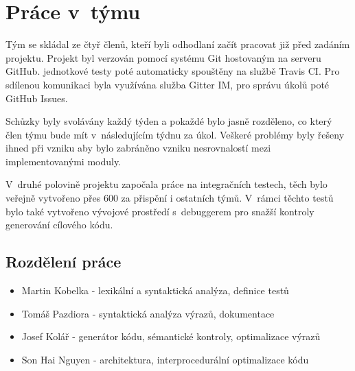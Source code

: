 \section{Práce v~týmu}
Tým se skládal ze čtyř členů, kteří byli odhodlaní začít
pracovat již před zadáním projektu. Projekt byl verzován pomocí systému Git hostovaným na serveru GitHub. jednotkové testy poté automaticky spouštěny na službě Travis CI. Pro sdílenou komunikaci byla využívána služba Gitter IM, pro správu úkolů poté GitHub Issues.

Schůzky byly svolávány každý týden a pokaždé bylo jasně rozděleno, co který člen týmu bude mít v~následujícím týdnu za úkol. Veškeré problémy byly řešeny ihned při vzniku aby bylo zabráněno vzniku nesrovnalostí mezi implementovanými moduly. 

V~druhé polovině projektu započala práce na integračních testech, těch bylo veřejně vytvořeno přes 600 za přispění i ostatních týmů. V~rámci těchto testů bylo také vytvořeno vývojové prostředí s~debuggerem pro snažší kontroly generování cílového kódu.

\subsection{Rozdělení práce}
\begin{itemize}
    \item Martin Kobelka - lexikální a syntaktická analýza, definice testů
    \item Tomáš Pazdiora - syntaktická analýza výrazů, dokumentace
    \item Josef Kolář - generátor kódu, sémantické kontroly, optimalizace výrazů
    \item Son Hai Nguyen - architektura, interprocedurální optimalizace kódu
\end{itemize}